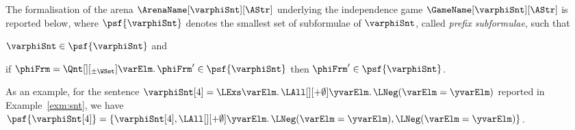 \documentclass[authoryear]{elsarticle}
\begin{document}
The formalisation of the arena $\ArenaName[\varphiSnt][\AStr]$ underlying the
independence game $\GameName[\varphiSnt][\AStr]$ is reported below, where
$\psf{\varphiSnt}$ denotes the smallest set of subformulae of $\varphiSnt$,
called \emph{prefix subformulae}, such that
\begin{inparaenum}[(i)]
  \item
    $\varphiSnt \in \psf{\varphiSnt}$ and
  \item
    if $\phiFrm = \Qnt[][_{\pm\WSet}] \varElm \ldotp \phiFrm' \in
    \psf{\varphiSnt}$ then $\phiFrm' \in \psf{\varphiSnt}$.
\end{inparaenum}
As an example, for the sentence $\varphiSnt[4] = \LExs \varElm \ldotp
\LAll[][+\emptyset] \yvarElm \ldotp \LNeg (\varElm = \yvarElm)$ reported in
Example~\ref{exm:snt}, we have $\psf{\varphiSnt[4]} = \{ \varphiSnt[4],
\LAll[][+\emptyset] \yvarElm \ldotp \LNeg (\varElm = \yvarElm), \LNeg (\varElm =
\yvarElm) \}$.
\end{document}
